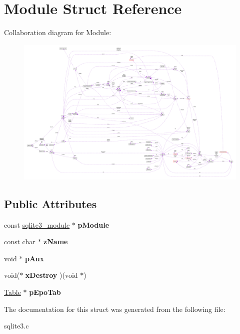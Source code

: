 \hypertarget{structModule}{}\section{Module Struct Reference}
\label{structModule}


Collaboration diagram for Module\+:\nopagebreak
\begin{figure}[H]
\begin{center}
\leavevmode
\includegraphics[width=350pt]{structModule__coll__graph}
\end{center}
\end{figure}
\subsection*{Public Attributes}
\begin{DoxyCompactItemize}
\item 
const \hyperlink{structsqlite3__module}{sqlite3\+\_\+module} $\ast$ {\bfseries p\+Module}\hypertarget{structModule_a65d2539d71ea028b505b2fb33563bfd7}{}\label{structModule_a65d2539d71ea028b505b2fb33563bfd7}

\item 
const char $\ast$ {\bfseries z\+Name}\hypertarget{structModule_a45a5f5b43926b8ebf3e13e46a6534810}{}\label{structModule_a45a5f5b43926b8ebf3e13e46a6534810}

\item 
void $\ast$ {\bfseries p\+Aux}\hypertarget{structModule_ae3b827fee4c8b4f3ff38c86c2e2f48cd}{}\label{structModule_ae3b827fee4c8b4f3ff38c86c2e2f48cd}

\item 
void($\ast$ {\bfseries x\+Destroy} )(void $\ast$)\hypertarget{structModule_a4a4b707d6ad852cf2e8d983d22886cc1}{}\label{structModule_a4a4b707d6ad852cf2e8d983d22886cc1}

\item 
\hyperlink{structTable}{Table} $\ast$ {\bfseries p\+Epo\+Tab}\hypertarget{structModule_a546d1d825743f3083e7413f9f280d402}{}\label{structModule_a546d1d825743f3083e7413f9f280d402}

\end{DoxyCompactItemize}


The documentation for this struct was generated from the following file\+:\begin{DoxyCompactItemize}
\item 
sqlite3.\+c\end{DoxyCompactItemize}
